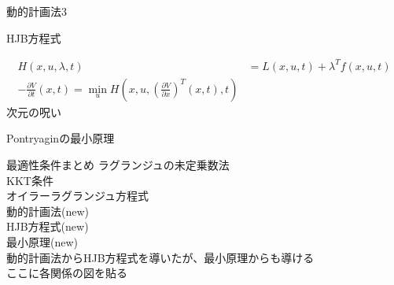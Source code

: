 \documentclass[dvipdfmx,12pt]{beamer}
\begin{document}
    \begin{frame}{動的計画法3}
        \footnotesize
    \end{frame}

    \begin{frame}{HJB方程式}
        \footnotesize
        
        \begin{align*}
            H(x, u, \lambda, t) &= L(x, u, t) + \lambda^T f(x, u, t) \\
            -\frac{\partial V}{\partial t}\left(x,t\right) = \min _u H\left(x, u, \left( \frac{\partial V}{\partial x} \right)^T\left(x, t\right), t \right)
        \end{align*}
        \centering
        次元の呪い\\
    \end{frame}

    \begin{frame}{Pontryaginの最小原理}
        \footnotesize

    \end{frame}

    \begin{frame}{最適性条件まとめ}
        \footnotesize
        ラグランジュの未定乗数法\\
        KKT条件\\
        オイラーラグランジュ方程式\\
        動的計画法(new)\\
        HJB方程式(new)\\
        最小原理(new)\\
        動的計画法からHJB方程式を導いたが、最小原理からも導ける\\

        ここに各関係の図を貼る
    \end{frame}
\end{document}
